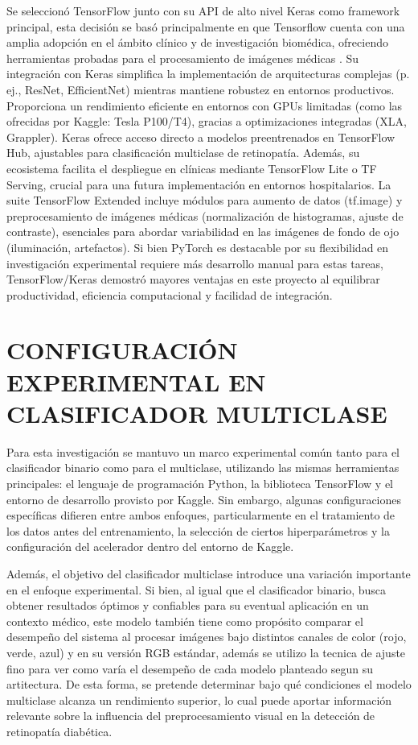 Se seleccionó TensorFlow junto con su API de alto nivel Keras como framework principal,
esta decisión se basó principalmente en que Tensorflow cuenta con una amplia adopción en
el ámbito clínico y de investigación biomédica, ofreciendo herramientas probadas para el
procesamiento de imágenes médicas . Su integración con
Keras simplifica la implementación de arquitecturas complejas (p. ej., ResNet,
EfficientNet) mientras mantiene robustez en entornos productivos. Proporciona un
rendimiento eficiente en entornos con GPUs limitadas (como las ofrecidas por Kaggle: Tesla
P100/T4), gracias a optimizaciones integradas (XLA, Grappler). Keras ofrece acceso directo
a modelos preentrenados en TensorFlow Hub, ajustables para clasificación multiclase de
retinopatía. Además, su ecosistema facilita el despliegue en clínicas mediante TensorFlow
Lite o TF Serving, crucial para una futura implementación en entornos hospitalarios. La
suite TensorFlow Extended incluye módulos para aumento de datos (tf.image) y
preprocesamiento de imágenes médicas (normalización de histogramas, ajuste de contraste),
esenciales para abordar variabilidad en las imágenes de fondo de ojo (iluminación,
artefactos). Si bien PyTorch es destacable por su flexibilidad en investigación
experimental requiere más desarrollo manual para estas tareas, TensorFlow/Keras demostró
mayores ventajas en este proyecto al equilibrar productividad, eficiencia computacional y
facilidad de integración.

\section{CONFIGURACIÓN EXPERIMENTAL EN CLASIFICADOR MULTICLASE}

Para esta investigación se mantuvo un marco experimental común tanto para el clasificador
binario como para el multiclase, utilizando las mismas herramientas principales: el
lenguaje de programación Python, la biblioteca TensorFlow y el entorno de desarrollo
provisto por Kaggle. Sin embargo, algunas configuraciones específicas difieren entre ambos
enfoques, particularmente en el tratamiento de los datos antes del entrenamiento, la
selección de ciertos hiperparámetros y la configuración del acelerador dentro del entorno
de Kaggle.

Además, el objetivo del clasificador multiclase introduce una variación importante en el
enfoque experimental. Si bien, al igual que el clasificador binario, busca obtener
resultados óptimos y confiables para su eventual aplicación en un contexto médico, este
modelo también tiene como propósito comparar el desempeño del sistema al procesar imágenes
bajo distintos canales de color (rojo, verde, azul) y en su versión RGB estándar, además
se utilizo la tecnica de ajuste fino para ver como varía el desempeño de cada modelo
planteado segun su artitectura. De esta forma, se pretende determinar bajo qué condiciones
el modelo multiclase alcanza un rendimiento superior, lo cual puede aportar información
relevante sobre la influencia del preprocesamiento visual en la detección de retinopatía
diabética.

